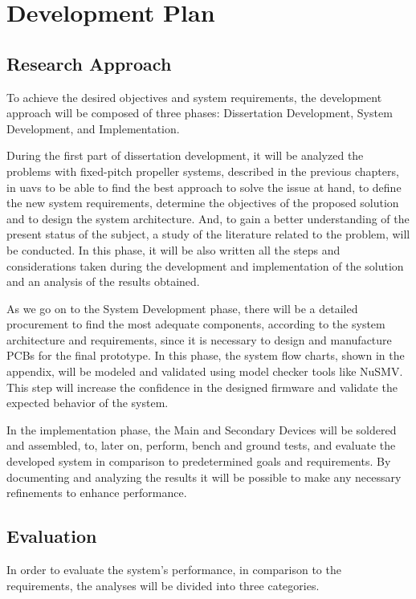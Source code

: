 \chapter{Development Plan}
\label{chap:Chapter5}
\section{Research Approach}
To achieve the desired objectives and system requirements, the development approach will be composed of three phases: Dissertation Development, System Development, and Implementation.

During the first part of dissertation development, it will be analyzed the problems with fixed-pitch propeller systems, described in the previous chapters, in \glspl{uav} to be able to find the best approach to solve the issue at hand, to define the new system requirements, determine the objectives of the proposed solution and to design the system architecture.
And, to gain a better understanding of the present status of the subject, a study of the literature related to the problem, will be conducted.
In this phase, it will be also written all the steps and considerations taken during the development and implementation of the solution and an analysis of the results obtained.

As we go on to the System Development phase, there will be a detailed procurement to find the most adequate components, according to the system architecture and requirements, since it is necessary to design and manufacture \glspl{PCB} for the final prototype.
In this phase, the system flow charts, shown in the appendix, will be modeled and validated using model checker tools like NuSMV.
This step will increase the confidence in the designed firmware and validate the expected behavior of the system.

In the implementation phase, the Main and Secondary Devices will be soldered and assembled, to, later on, perform, bench and ground tests, and evaluate the developed system in comparison to predetermined goals and requirements.
By documenting and analyzing the results it will be possible to make any necessary refinements to enhance performance.


\section{Evaluation}
In order to evaluate the system's performance, in comparison to the requirements, the analyses will be divided into three categories.

